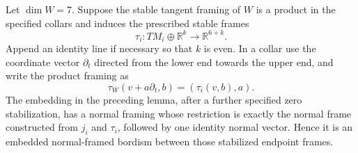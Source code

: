 \begin{lemma}
\label{courseIII:pt-relative-normal-frame}
Let $\dim W=7$.  Suppose the stable tangent framing of $W$ is a product
in the specified collars and induces the prescribed stable frames
\[
 \tau_i:TM_i\oplus\mathbb R^k\longrightarrow\mathbb R^{6+k}.
\]
Append an identity line if necessary so that $k$ is even.  In a collar
use the coordinate vector $\partial_t$ directed from the lower end
towards the upper end, and write the product framing as
\[
 \tau_W(v+a\partial_t,b)=(\tau_i(v,b),a).
 \tag{RB.2}
\]
The embedding in the preceding lemma, after a further specified zero
stabilization, has a normal framing whose restriction is exactly the
normal frame constructed from $j_i$ and $\tau_i$, followed by one
identity normal vector.  Hence it is an embedded normal-framed bordism
between those stabilized endpoint frames.
\end{lemma}

